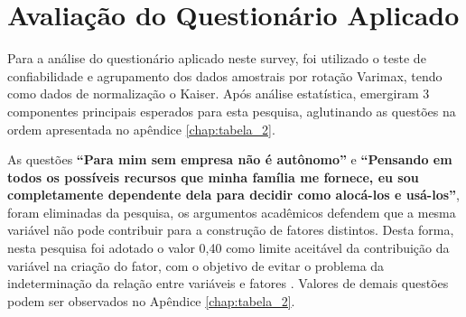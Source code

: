\section{Avaliação do Questionário Aplicado}

Para a análise do questionário aplicado neste survey, foi utilizado o teste de confiabilidade e agrupamento dos dados amostrais por rotação Varimax, tendo como dados de normalização o Kaiser\footnotemark[1]. Após análise estatística, emergiram 3 componentes principais esperados para esta pesquisa, aglutinando as questões na ordem apresentada no apêndice \ref{chap:tabela_2}.


As questões \textbf{“Para mim sem empresa não é autônomo”} e \textbf{“Pensando em todos os possíveis recursos que minha família me fornece, eu sou completamente dependente dela para decidir como alocá-los e usá-los”}, foram eliminadas da pesquisa, os argumentos acadêmicos defendem que a mesma variável não pode contribuir para a construção de fatores distintos. Desta forma, nesta pesquisa foi adotado o valor 0,40 como limite aceitável da contribuição da variável na criação do fator, com o objetivo de evitar o problema da indeterminação da relação entre variáveis e fatores \cite{figueiredo_filho_visao_2010}. Valores de demais questões podem ser observados no  Apêndice \ref{chap:tabela_2}. 







